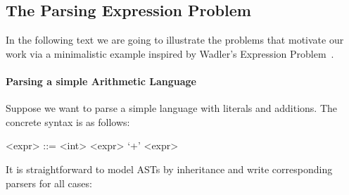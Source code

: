 \subsection{The Parsing Expression Problem}\label{subsec:overview-problem}


In the following text we are going to illustrate the problems that
motivate our work via a minimalistic example inspired by Wadler's
Expression Problem~\cite{}.

\paragraph{Parsing a simple Arithmetic Language}
Suppose we want to parse a simple language with literals and
additions. The concrete syntax is as follows:

\setlength{\grammarindent}{5em}
\begin{grammar}
<expr> ::= <int>
    \alt <expr> `+' <expr>
\end{grammar}

\noindent It is straightforward to model ASTs by inheritance and write corresponding parsers for all cases:

